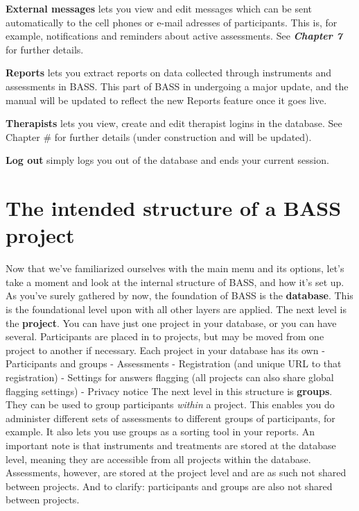 \documentclass[
]{book}
\begin{document}
\textbf{External messages} lets you view and edit messages which can be sent automatically to the cell phones or e-mail adresses of participants. This is, for example, notifications and reminders about active assessments. See \textbf{\emph{Chapter 7}} for further details.

\textbf{Reports} lets you extract reports on data collected through instruments and assessments in BASS. This part of BASS in undergoing a major update, and the manual will be updated to reflect the new Reports feature once it goes live.

\textbf{Therapists} lets you view, create and edit therapist logins in the database. See Chapter \# for further details (under construction and will be updated).

\textbf{Log out} simply logs you out of the database and ends your current session.

\section{The intended structure of a BASS project}\label{the-intended-structure-of-a-bass-project}

Now that we've familiarized ourselves with the main menu and its options, let's take a moment and look at the internal structure of BASS, and how it's set up.
As you've surely gathered by now, the foundation of BASS is the \textbf{database}. This is the foundational level upon with all other layers are applied. The next level is the \textbf{project}. You can have just one project in your database, or you can have several. Participants are placed in to projects, but may be moved from one project to another if necessary. Each project in your database has its own
- Participants and groups
- Assessments
- Registration (and unique URL to that registration)
- Settings for answers flagging (all projects can also share global flagging settings)
- Privacy notice
The next level in this structure is \textbf{groups}. They can be used to group participants \emph{within} a project. This enables you do administer different sets of assessments to different groups of participants, for example. It also lets you use groups as a sorting tool in your reports.
An important note is that instruments and treatments are stored at the database level, meaning they are accessible from all projects within the database. Assessments, however, are stored at the project level and are as such not shared between projects.
And to clarify: participants and groups are also not shared between projects.
\end{document}

